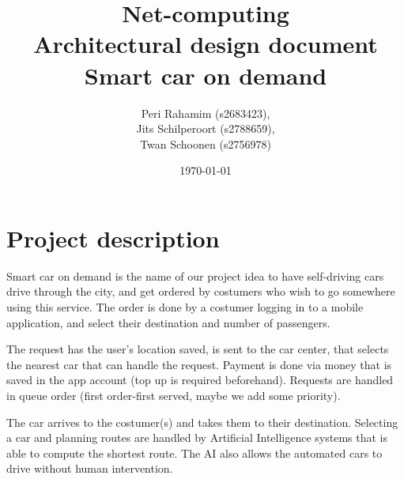 \documentclass[a4paper]{article}
\begin{document}
\title{Net-computing\\
Architectural design document\\
Smart car on demand
}

\date{\today}

\author{Peri Rahamim (s2683423),\\
Jits Schilperoort (s2788659),\\
Twan Schoonen (s2756978)
}


\maketitle
\section*{Project description}
Smart car on demand is the name of our project idea to have self-driving cars drive through the city, and get ordered by costumers who wish to go somewhere using this service. The order is done by a costumer logging in to a mobile application, and select their destination and number of passengers.

The request has the user's location saved, is sent to the car center, that selects the nearest car that can handle the request. Payment is done via money that is saved in the app account (top up is required beforehand). Requests are handled in queue order (first order-first served, maybe we add some priority).

The car arrives to the costumer(s) and takes them to their destination. Selecting a car and planning routes are handled by Artificial Intelligence systems that is able to compute the shortest route. The AI also allows the automated cars to drive without human intervention.
\end{document}
